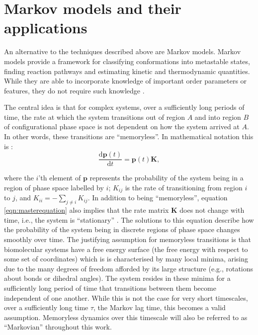 \section{Markov models and their applications}\label{sec:mm_applications}
An alternative to the techniques described above are Markov models.  Markov models provide a framework for classifying conformations into metastable states, finding reaction pathways and estimating kinetic and thermodynamic quantities. While they are able to incorporate knowledge of important order parameters or features, they do not require such knowledge \cite{husicMarkovStateModels2018, pandeEverythingYouWanted2010}.

The central idea \cite{zwanzigClassicalDynamicsContinuous1983a} is that for complex systems, over a sufficiently long periods of time, the rate at which the system transitions out of region $A$ and into region $B$ of configurational phase space is not dependent on how the system arrived at $A$. In other words, these transitions are ``memoryless''. In mathematical notation this is \cite{noeTransitionNetworksModeling2008}: 
\begin{equation}\label{eqn:masterequation}
    \frac{\mathrm{d}\mathbf{p}(t)}{\mathrm{d}t} = \mathbf{p}(t)\mathbf{K},
\end{equation}

where the $i$'th element of $\mathbf{p}$ represents the probability of the system being in a region of phase space labelled by $i$; $K_{ij}$ is the rate of transitioning from region $i$ to $j$, and $K_{ii} = -\sum_{j\ne i} K_{ij}$. In addition to being ``memoryless'', equation \ref{eqn:masterequation} also implies that the rate matrix $\mathbf{K}$ does not change with time, i.e., the system is ``stationary'' \cite{zwanzigClassicalDynamicsContinuous1983a}.  The solutions to this equation describe how the probability of the system being in discrete regions of phase space changes smoothly over time. The justifying assumption for memoryless transitions is that biomolecular systems have a free energy surface (the free energy with respect to some set of coordinates) which is is characterised by many local minima, arising due to the many degrees of freedom afforded by its large structure (e.g., rotations about bonds or dihedral angles). The system resides in these minima for a sufficiently long period of time that transitions between them become independent of one another.  While this is not the case for very short timescales, over a sufficiently long time $\tau$, the Markov lag time, this becomes a valid assumption. Memoryless dynamics over this timescale will also be referred to as ``Markovian'' throughout this work.

